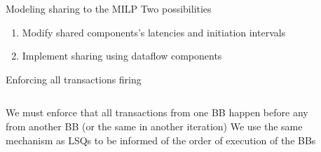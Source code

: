 \documentclass{beamer}
\begin{document}
\begin{frame}{Modeling sharing to the MILP}
Two possibilities
\begin{enumerate}
    \item Modify shared components's latencies and initiation intervals
    \item Implement sharing using dataflow components
\end{enumerate}
\end{frame}

\begin{frame}{Enforcing all transactions firing}
\begin{columns}
    \begin{column}{0.45\textwidth}
    We must enforce that all transactions from one BB happen before any from another BB (or the same in another iteration) \newline \newline
    We use the same mechanism as LSQs to be informed of the order of execution of the BBs
    \end{column}
    \begin{column}{0.1\textwidth}
    \end{column}
    \begin{column}{0.45\textwidth}

\end{column}
\end{columns}
\end{frame}
\end{document}
